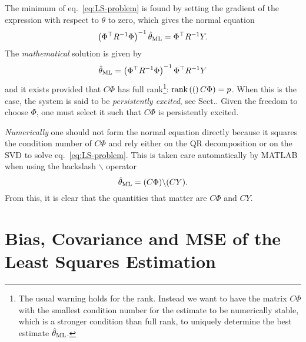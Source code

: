 The minimum of eq.~\eqref{eq:LS-problem} is found by setting the gradient of the expression with respect to $\theta$ to zero, which gives the normal equation
\begin{equation*}
  \left(\Phi^\top R^{-1}\Phi\right)^{-1} \hat{\theta}_\textrm{ML} = \Phi^\top R^{-1}Y.
\end{equation*}
The \emph{mathematical} solution is given by
\begin{equation}
  \label{eq:LS-estimator}
  \hat{\theta}_\textrm{ML} = \left(\Phi^\top R^{-1}\Phi\right)^{-1} \Phi^\top R^{-1}Y
\end{equation}
and it exists provided that $C\Phi$ has full rank\footnote{The usual warning holds for the rank. Instead we want to have the matrix $C\Phi$ with the smallest condition number for the estimate to be numerically stable, which is a stronger condition than full rank, to uniquely determine the best estimate $\hat{\theta}_\textrm{ML}$.}: $\textrm{rank}\left((\right)C\Phi) = p$. When this is the case, the system is said to be \emph{persistently excited}, see Sect.. Given the freedom to choose $\Phi$, one must select it such that $C\Phi$ is persistently excited.

\emph{Numerically} one should not form the normal equation directly because it squares the condition number of $C\Phi$ and rely either on the QR decomposition or on the SVD to solve eq.~\eqref{eq:LS-problem}.
This is taken care automatically by MATLAB when using the backslash $\backslash$ operator
\begin{equation}
  \label{eq:LS-numerical-solution}
  \hat{\theta}_\textrm{ML} = (C\Phi) \backslash (CY).
\end{equation}
From this, it is clear that the quantities that matter are $C\Phi$ and $CY$.

\section{Bias, Covariance and MSE of the Least Squares Estimation}
\label{sec:bias-variance-MSE-LS-estimation}

